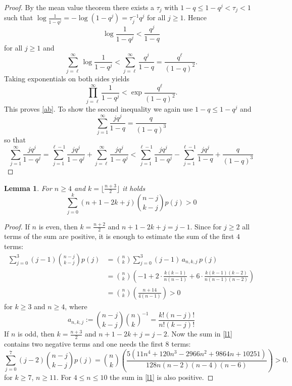 \documentclass[12pt]{amsart}
\newtheorem{lem}[thm]{Lemma}
\theoremstyle{definition}
\theoremstyle{remark}
\begin{document}
\begin{proof}
By the mean value theorem there exists a $\tau_j$ with 
$1-q\le 1-q^j<\tau_j <1$  such that $\log \frac{1}{1-q^j}=-\log(1-q^j)=\tau_j^{-1}q^j$
for all $j\ge 1$. Hence 
$$\log \frac{1}{1-q^j}<\frac{q^j}{1-q}$$
 for all $j\ge 1$ and
\begin{equation*}
\sum_{j=\ell}^{\infty} \log \frac{1}{1-q^j}< \sum_{j=\ell}^{\infty}\frac{q^j}{1-q}=\frac{q^{\ell}}{(1-q)^2}.
\end{equation*}
Taking exponentials on both sides yields 
$$\prod_{j=\ell}^{\infty}\frac{1}{1-q^j}<\exp{\frac{q^{\ell}}{(1-q)^2}}.$$
This proves \eqref{ab}. To show the second inequality we again use $1-q\le 1-q^j$ and 
\begin{equation*}
\sum_{j=1}^{\infty}\frac{jq^j}{1-q}=\frac{q}{(1-q)^3}
\end{equation*}
so that
\begin{equation*}
\sum_{j=1}^{\infty}\frac{jq^j}{1-q^j} = \sum_{j=1}^{\ell -1}\frac{jq^j}{1-q^j}+
\sum_{j=\ell}^{\infty}\frac{jq^j}{1-q^j}
< \sum_{j=1}^{\ell -1}\frac{jq^j}{1-q^j}-\sum_{j=1}^{\ell -1}\frac{jq^j}{1-q}+\frac{q}{(1-q)^3}
\end{equation*} 
\end{proof}

\begin{lem}\label{links}
For $n\ge 4$ and $k=\lfloor\frac{n+3}{2}\rfloor$ it holds
\begin{equation}\label{l1}
\sum_{j=0}^k (n+1-2k+j)\binom{n-j}{k-j}p(j)>0
\end{equation}
\end{lem}

\begin{proof}
If $n$ is even, then $k=\frac{n+2}{2}$ and $n+1-2k+j=j-1$.
Since for $j\ge 2$ all terms of the sum are positive, it is
enough to estimate the sum of the first $4$ terms:
\begin{align*}
\sum_{j=0}^3 (j-1)\binom{n-j}{k-j}p(j)& = \binom{n}{k}\sum_{j=0}^3 (j-1)\, a_{n,k,j}\, p(j)\\
 & =\binom{n}{k} \left(-1+2\cdot\frac{k(k-1)}{n(n-1)}+
6\cdot\frac{k(k-1)(k-2)}{n(n-1)(n-2)}\right)\\
& =  \binom{n}{k} \left(\frac{n+14}{4(n-1)}\right)>0
\end{align*}
for $k\ge 3$ and $n\ge 4$, where 
\begin{equation*}
a_{n,k,j}:=\binom{n-j}{k-j}\binom{n}{k}^{-1}= \frac{k!(n-j)!}{n!(k-j)!}
\end{equation*}
If $n$ is odd, then $k=\frac{n+3}{2}$ and $n+1-2k+j=j-2$.
Now the sum in \eqref{l1} contains two negative terms and 
one needs the first 8 terms:
\begin{equation*}
\sum_{j=0}^7 (j-2)\binom{n-j}{k-j}p(j) = \binom{n}{k} 
\left(\frac{5(11n^4+120n^3-2966n^2+9864n+10251)}
{128n(n-2)(n-4)(n-6)}\right)>0.
\end{equation*}  
for $k\ge 7$, $n\ge 11$. For $4\le n\le 10$ the sum in \eqref{l1} is also positive.  
\end{proof}
\end{document}

